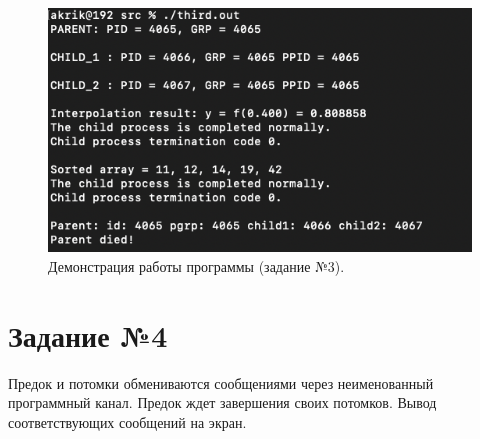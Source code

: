 \documentclass[12pt]{report}
\begin{document}
\begin{figure}[H]

	\centering

	\includegraphics[width=\linewidth]{img/third.png}
	\caption{Демонстрация работы программы (задание №3).}

	\label{fig:task03}

\end{figure}

\section*{Задание №4}

Предок и потомки обмениваются сообщениями через неименованный
программный канал. Предок ждет завершения своих потомков. Вывод соответствующих сообщений на экран.
\end{document}
